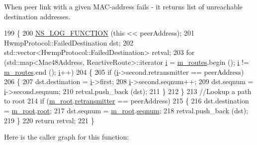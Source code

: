 When peer link with a given M\+A\+C-\/address fails -\/ it returns list of unreachable destination addresses. 


\begin{DoxyCode}
199 \{
200   \hyperlink{log-macros-disabled_8h_a90b90d5bad1f39cb1b64923ea94c0761}{NS\_LOG\_FUNCTION} (\textcolor{keyword}{this} << peerAddress);
201   HwmpProtocol::FailedDestination dst;
202   std::vector<HwmpProtocol::FailedDestination> retval;
203   \textcolor{keywordflow}{for} (std::map<Mac48Address, ReactiveRoute>::iterator \hyperlink{bernuolliDistribution_8m_a6f6ccfcf58b31cb6412107d9d5281426}{i} = \hyperlink{classns3_1_1dot11s_1_1HwmpRtable_a72afac5a0c979b3d4f160786ef865eab}{m\_routes}.begin (); 
      \hyperlink{bernuolliDistribution_8m_a6f6ccfcf58b31cb6412107d9d5281426}{i} != \hyperlink{classns3_1_1dot11s_1_1HwmpRtable_a72afac5a0c979b3d4f160786ef865eab}{m\_routes}.end (); \hyperlink{bernuolliDistribution_8m_a6f6ccfcf58b31cb6412107d9d5281426}{i}++)
204     \{
205       \textcolor{keywordflow}{if} (\hyperlink{bernuolliDistribution_8m_a6f6ccfcf58b31cb6412107d9d5281426}{i}->second.retransmitter == peerAddress)
206         \{
207           dst.destination = \hyperlink{bernuolliDistribution_8m_a6f6ccfcf58b31cb6412107d9d5281426}{i}->first;
208           \hyperlink{bernuolliDistribution_8m_a6f6ccfcf58b31cb6412107d9d5281426}{i}->second.seqnum++;
209           dst.seqnum = \hyperlink{bernuolliDistribution_8m_a6f6ccfcf58b31cb6412107d9d5281426}{i}->second.seqnum;
210           retval.push\_back (dst);
211         \}
212     \}
213   \textcolor{comment}{//Lookup a path to root}
214   \textcolor{keywordflow}{if} (\hyperlink{classns3_1_1dot11s_1_1HwmpRtable_ac0dfb00c0c51b00ea3d5d78d0fbc5cd7}{m\_root}.\hyperlink{structns3_1_1dot11s_1_1HwmpRtable_1_1ProactiveRoute_abb707d798427423e58ef73b2e2aed9f6}{retransmitter} == peerAddress)
215     \{
216       dst.destination = \hyperlink{classns3_1_1dot11s_1_1HwmpRtable_ac0dfb00c0c51b00ea3d5d78d0fbc5cd7}{m\_root}.\hyperlink{structns3_1_1dot11s_1_1HwmpRtable_1_1ProactiveRoute_a42d8bbf612313efa6d8abe0f8aeae186}{root};
217       dst.seqnum = \hyperlink{classns3_1_1dot11s_1_1HwmpRtable_ac0dfb00c0c51b00ea3d5d78d0fbc5cd7}{m\_root}.\hyperlink{structns3_1_1dot11s_1_1HwmpRtable_1_1ProactiveRoute_abd6cc9a9b395eecbacd323fb6e24b539}{seqnum};
218       retval.push\_back (dst);
219     \}
220   \textcolor{keywordflow}{return} retval;
221 \}
\end{DoxyCode}


Here is the caller graph for this function\+:


